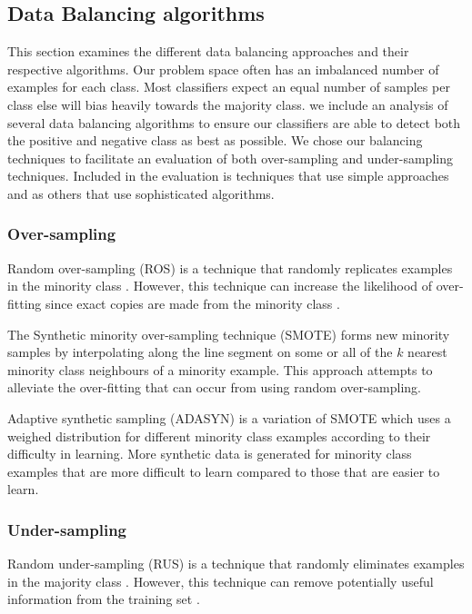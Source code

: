 \documentclass{sig-alternate-05-2015}
\begin{document}
	\subsection{Data Balancing algorithms}
	This section examines the different data balancing approaches and their respective algorithms. Our problem space often has an imbalanced number of examples for each class. Most classifiers expect an equal number of samples per class else will bias heavily towards the majority class. we include an analysis of several data balancing algorithms to ensure our classifiers are able to detect both the positive and negative class as best as possible. We chose our balancing techniques to facilitate an evaluation of both over-sampling and under-sampling techniques. Included in the evaluation is techniques that use simple approaches and as others that use sophisticated algorithms.
	\subsubsection{Over-sampling}
	Random over-sampling (ROS) is a technique that randomly replicates examples in the minority class \cite{Batista:2004:SBS:1007730.1007735}. However, this technique can increase the likelihood of over-fitting since exact copies are made from the minority class \cite{Batista:2004:SBS:1007730.1007735}.
	
	The Synthetic minority over-sampling technique (SMOTE) \cite{Chawla:2002:SSM:1622407.1622416} forms new minority samples by interpolating along the line segment on some or all of the $k$ nearest minority class neighbours of a minority example. This approach attempts to alleviate the over-fitting that can occur from using random over-sampling.
	
	Adaptive synthetic sampling (ADASYN) \cite{4633969} is a variation of SMOTE which uses a weighed distribution for different minority class examples according to their difficulty in learning. More synthetic data is generated for minority class examples that are more difficult to learn compared to those that are easier to learn.
	
	\subsubsection{Under-sampling}
	Random under-sampling (RUS) is a technique that randomly eliminates examples in the majority class \cite{Batista:2004:SBS:1007730.1007735}. However, this technique can remove potentially useful information from the training set \cite{Batista:2004:SBS:1007730.1007735}. 
	
\end{document}
